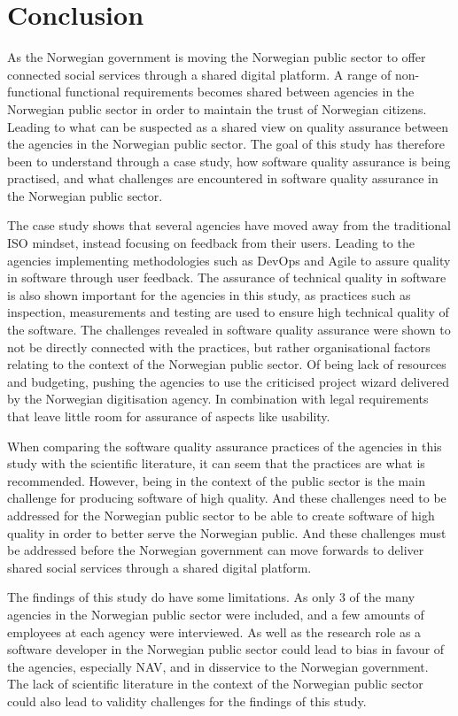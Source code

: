 \chapter{Conclusion} \label{sec:conclusion}
As the Norwegian government is moving the Norwegian public sector to offer connected social services through a shared digital platform. A range of non-functional functional requirements becomes shared between agencies in the Norwegian public sector in order to maintain the trust of Norwegian citizens. Leading to what can be suspected as a shared view on quality assurance between the agencies in the Norwegian public sector. The goal of this study has therefore been to understand through a case study, how software quality assurance is being practised, and what challenges are encountered in software quality assurance in the Norwegian public sector.

The case study shows that several agencies have moved away from the traditional ISO mindset, instead focusing on feedback from their users. Leading to the agencies implementing methodologies such as DevOps and Agile to assure quality in software through user feedback. The assurance of technical quality in software is also shown important for the agencies in this study, as practices such as inspection, measurements and testing are used to ensure high technical quality of the software. The challenges revealed in software quality assurance were shown to not be directly connected with the practices, but rather organisational factors relating to the context of the Norwegian public sector. Of being lack of resources and budgeting, pushing the agencies to use the criticised project wizard delivered by the Norwegian digitisation agency. In combination with legal requirements that leave little room for assurance of aspects like usability.

When comparing the software quality assurance practices of the agencies in this study with the scientific literature, it can seem that the practices are what is recommended. However, being in the context of the public sector is the main challenge for producing software of high quality. And these challenges need to be addressed for the Norwegian public sector to be able to create software of high quality in order to better serve the Norwegian public. And these challenges must be addressed before the Norwegian government can move forwards to deliver shared social services through a shared digital platform.

The findings of this study do have some limitations. As only 3 of the many agencies in the Norwegian public sector were included, and a few amounts of employees at each agency were interviewed. As well as the research role as a software developer in the Norwegian public sector could lead to bias in favour of the agencies, especially NAV, and in disservice to the Norwegian government. The lack of scientific literature in the context of the Norwegian public sector could also lead to validity challenges for the findings of this study.

